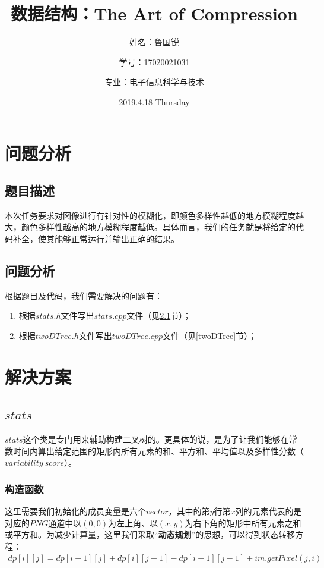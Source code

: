\documentclass[UTF8]{ctexart}
\title{数据结构：The Art of Compression}
\author{姓名：鲁国锐 \protect\newline
\and 学号：17020021031 \\
\and 专业：电子信息科学与技术}
\date{2019.4.18    Thursday}
\begin{document}
	\maketitle
	\renewcommand{\contentsname}{Contents}
	\tableofcontents
	\newpage
	
	\hypersetup{
	bookmarks=true,
	colorlinks=true,
	linkcolor=red,
	urlcolor=blue
	}
	\section{问题分析}
	\subsection{题目描述}
	\indent 本次任务要求对图像进行有针对性的模糊化，即颜色多样性越低的地方模糊程度越大，颜色多样性越高的地方模糊程度越低。具体而言，我们的任务就是将给定的代码补全，使其能够正常运行并输出正确的结果。

	\subsection{问题分析}
	\indent 根据题目及代码，我们需要解决的问题有：
	\begin{enumerate}[leftmargin=50pt]
	\item 根据$stats.h$文件写出$stats.cpp$文件（见\ref{stats}节）；
	\item 根据$twoDTree.h$文件写出$twoDTree.cpp$文件（见\ref{twoDTree}节）；
	\end{enumerate}
	

	
	\section{解决方案}
		\subsection{$stats$}\label{stats}
		\indent $stats$这个类是专门用来辅助构建二叉树的。更具体的说，是为了让我们能够在常数时间内算出给定范围的矩形内所有元素的和、平方和、平均值以及多样性分数（$variability\ score$）。
		
			\subsubsection{构造函数}
			\indent 这里需要我们初始化的成员变量是六个$vector$，其中的第$y$行第$x$列的元素代表的是对应的$PNG$通道中以$(0,0)$为左上角、以$(x, y)$为右下角的矩形中所有元素之和或平方和。为减少计算量，这里我们采取“\textbf{动态规划}”的思想，可以得到状态转移方程：
			\begin{align}
			dp[i][j] = dp[i-1][j] + dp[i][j-1] - dp[i-1][j-1] + im.getPixel(j, i) \label{construction}
			\end{align}
			
\end{document}
